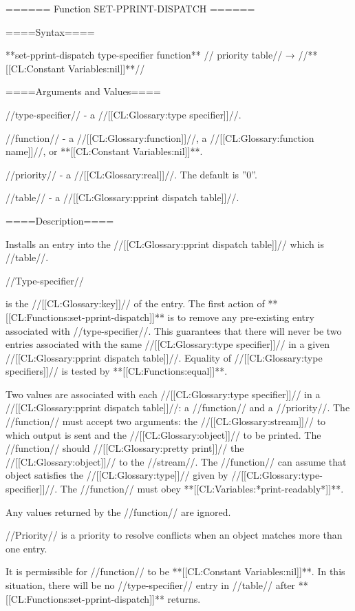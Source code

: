 ====== Function SET-PPRINT-DISPATCH ======

====Syntax====

**set-pprint-dispatch {type-specifier function** //\opt} priority table// → //**[[CL:Constant Variables:nil]]**//

====Arguments and Values====

//type-specifier// - a //[[CL:Glossary:type specifier]]//.

//function// - a //[[CL:Glossary:function]]//, a //[[CL:Glossary:function name]]//, or **[[CL:Constant Variables:nil]]**.

//priority// - a //[[CL:Glossary:real]]//. The default is ''0''.

//table// - a //[[CL:Glossary:pprint dispatch table]]//. 

====Description====

Installs an entry into the //[[CL:Glossary:pprint dispatch table]]// which is //table//.

//Type-specifier//

is the //[[CL:Glossary:key]]// of the entry. The first action of **[[CL:Functions:set-pprint-dispatch]]** is to remove any pre-existing entry associated with //type-specifier//. This guarantees that there will never be two entries associated with the same //[[CL:Glossary:type specifier]]// in a given //[[CL:Glossary:pprint dispatch table]]//. Equality of //[[CL:Glossary:type specifiers]]// is tested by **[[CL:Functions:equal]]**.

Two values are associated with each //[[CL:Glossary:type specifier]]// in a //[[CL:Glossary:pprint dispatch table]]//: a //function// and a //priority//. The //function// must accept two arguments: the //[[CL:Glossary:stream]]// to which output is sent and the //[[CL:Glossary:object]]// to be printed. The //function// should //[[CL:Glossary:pretty print]]// the //[[CL:Glossary:object]]// to the //stream//. The //function// can assume that object satisfies the //[[CL:Glossary:type]]// given by //[[CL:Glossary:type-specifier]]//. The //function// must obey **[[CL:Variables:*print-readably*]]**.

Any values returned by the //function// are ignored.

//Priority// is a priority to resolve conflicts when an object matches more than one entry.

It is permissible for //function// to be **[[CL:Constant Variables:nil]]**. In this situation, there will be no //type-specifier// entry in //table// after **[[CL:Functions:set-pprint-dispatch]]** returns.

